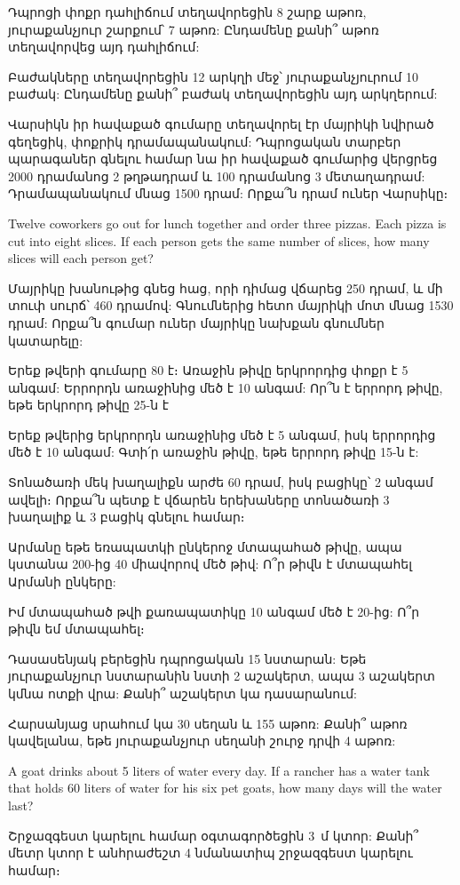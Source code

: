 \problem
Դպրոցի փոքր դահլիճում տեղավորեցին 8 շարք աթոռ, յուրաքանչյուր 
շարքում՝ 7 աթոռ: Ընդամենը քանի՞ աթոռ տեղավորվեց այդ դահլիճում:

\problem
Բաժակները տեղավորեցին 12 արկղի մեջ՝ յուրաքանչյուրում 10 
բաժակ: Ընդամենը քանի՞ բաժակ տեղավորեցին այդ արկղերում:

\problem
Վարսիկն իր հավաքած գումարը տեղա\-վորել էր մայրիկի նվիրած 
գեղեցիկ, փոքրիկ դրամա\-պանակում: Դպրոցական տարբեր պա\-րագաներ 
գնելու համար նա իր հավաքած գումարից վերցրեց 2000 դրամանոց 
2 թղթա\-դրամ և 100 դրամանոց 3 մետաղադրամ: Դրամապանակում 
մնաց 1500 դրամ: Որքա՞ն դրամ ուներ Վարսիկը։

\problem
Twelve coworkers go out for lunch together and order three 
pizzas. Each pizza is cut into eight slices. If each person 
gets the same number of slices, how many slices will each 
person get?

\problem
Մայրիկը խանութից գնեց հաց, որի դիմաց վճարեց 250 դրամ, 
և մի տուփ սուրճ՝ 460 դրամով: Գնումներից հետո մայրիկի 
մոտ մնաց 1530 դրամ: Որքա՞ն գումար ուներ մայրիկը նախքան 
գնումներ կատարելը:

\problem
Երեք թվերի գումարը 80 է։ Առաջին թիվը երկրորդից փոքր 
է 5 անգամ: Երրորդն առա\-ջինից մեծ է 10 անգամ: Որ՞ն է 
երրորդ թիվը, եթե երկրորդ թիվը 25-ն է

\problem
Երեք թվերից երկրորդն առաջինից մեծ է 5 անգամ, իսկ 
երրորդից մեծ է 10 անգամ: Գտի՛ր առաջին թիվը, եթե 
երրորդ թիվը 15-ն է:

\problem
Տոնածառի մեկ խաղալիքն արժե 60 դրամ, իսկ բացիկը՝ 2 
անգամ ավելի։ Որքա՞ն պետք է վճարեն երեխաները տոնածառի 
3 խաղալիք և 3 բացիկ գնելու համար։

\problem
Արմանը եթե եռապատկի ընկերոջ մտապահած թիվը, ապա կստանա 
200-ից 40 միավորով մեծ թիվ: Ո՞ր թիվն է մտապահել Արմանի 
ընկերը:

\problem
Իմ մտապահած թվի քառապատիկը 10 անգամ մեծ է 20-ից: Ո՞ր 
թիվն եմ մտապահել։

\problem
Դասասենյակ բերեցին դպրոցական 15 նստարան: Եթե յուրաքանչյուր 
նստարանին նստի 2 աշակերտ, ապա 3 աշակերտ կմնա ոտքի վրա: 
Քանի՞ աշակերտ կա դասարանում:

\problem
Հարսանյաց սրահում կա 30 սեղան և 155 աթոռ: Քանի՞ աթոռ 
կավելանա, եթե յուրաքանչյուր սեղանի շուրջ դրվի 4 աթոռ:

\problem
A goat drinks about 5 liters of water every day. If a 
rancher has a water tank that holds 60 liters of water 
for his six pet goats, how many days will the water last?

\problem
Շրջազգեստ կարելու համար օգտագործեցին 3~մ կտոր: Քանի՞ 
մետր կտոր է անհրաժեշտ 4 նմանատիպ շրջազգեստ կարելու համար։

